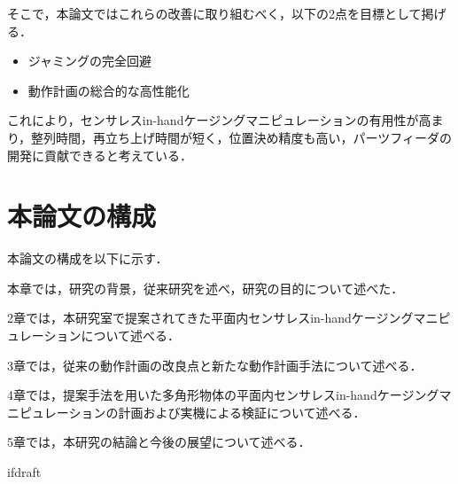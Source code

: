 \documentclass[a4paper,twoside,12pt,papersize, dvipdfmx]{iirthesis}
\begin{document}
そこで，本論文ではこれらの改善に取り組むべく，以下の2点を目標として掲げる．
\begin{itemize}
\item ジャミングの完全回避
\item 動作計画の総合的な高性能化
\end{itemize}
これにより，センサレスin-handケージングマニピュレーションの有用性が高まり，整列時間，再立ち上げ時間が短く，位置決め精度も高い，パーツフィーダの開発に貢献できると考えている．

\section{本論文の構成}\label{sec::intro::configuration}
本論文の構成を以下に示す．\par
本章では，研究の背景，従来研究を述べ，研究の目的について述べた．\par
2章では，本研究室で提案されてきた平面内センサレスin-handケージングマニピュレーションについて述べる．\par
3章では，従来の動作計画の改良点と新たな動作計画手法について述べる．\par
4章では，提案手法を用いた多角形物体の平面内センサレスin-handケージングマニピュレーションの計画および実機による検証について述べる．\par
5章では，本研究の結論と今後の展望について述べる．


\expandafter\ifx\csname ifdraft\endcsname\relax
    
\end{document}
